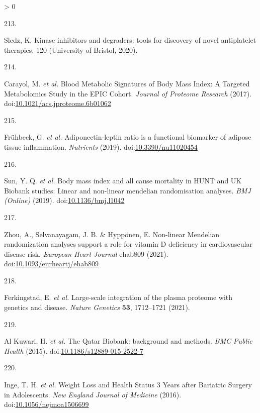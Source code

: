 \documentclass[11pt,twoside]{bristolthesis}
\newlength{\cslhangindent}
\newlength{\csllabelwidth}
\newenvironment{CSLReferences}[2] %
 {%
  \setlength{\parindent}{0pt}
  \ifodd #1 \everypar{\setlength{\hangindent}{\cslhangindent}}\ignorespaces\fi
  \ifnum #2 > 0
  \setlength{\parskip}{#2\baselineskip}
  \fi
 }%
 {}
\newcommand{\CSLLeftMargin}[1]{\parbox[t]{\csllabelwidth}{#1}}
\newcommand{\CSLRightInline}[1]{\parbox[t]{\linewidth - \csllabelwidth}{#1}\break}
\begin{document}
\begin{CSLReferences}{0}{0}
\leavevmode\hypertarget{ref-Sledz2020}{}%
\CSLLeftMargin{213. }
\CSLRightInline{Sledz, K. {Kinase inhibitors and degraders: tools for discovery of novel antiplatelet therapies}. 120 (University of Bristol, 2020).}

\leavevmode\hypertarget{ref-Carayol2017c}{}%
\CSLLeftMargin{214. }
\CSLRightInline{Carayol, M. \emph{et al.} {Blood Metabolic Signatures of Body Mass Index: A Targeted Metabolomics Study in the EPIC Cohort}. \emph{Journal of Proteome Research} (2017). doi:\href{https://doi.org/10.1021/acs.jproteome.6b01062}{10.1021/acs.jproteome.6b01062}}

\leavevmode\hypertarget{ref-Fruhbeck2019}{}%
\CSLLeftMargin{215. }
\CSLRightInline{Frühbeck, G. \emph{et al.} {Adiponectin-leptin ratio is a functional biomarker of adipose tissue inflammation}. \emph{Nutrients} (2019). doi:\href{https://doi.org/10.3390/nu11020454}{10.3390/nu11020454}}

\leavevmode\hypertarget{ref-Sun2019}{}%
\CSLLeftMargin{216. }
\CSLRightInline{Sun, Y. Q. \emph{et al.} {Body mass index and all cause mortality in HUNT and UK Biobank studies: Linear and non-linear mendelian randomisation analyses}. \emph{BMJ (Online)} (2019). doi:\href{https://doi.org/10.1136/bmj.l1042}{10.1136/bmj.l1042}}

\leavevmode\hypertarget{ref-Zhou2021}{}%
\CSLLeftMargin{217. }
\CSLRightInline{Zhou, A., Selvanayagam, J. B. \& Hyppönen, E. {Non-linear Mendelian randomization analyses support a role for vitamin D deficiency in cardiovascular disease risk}. \emph{European Heart Journal} ehab809 (2021). doi:\href{https://doi.org/10.1093/eurheartj/ehab809}{10.1093/eurheartj/ehab809}}

\leavevmode\hypertarget{ref-Ferkingstad2021}{}%
\CSLLeftMargin{218. }
\CSLRightInline{Ferkingstad, E. \emph{et al.} {Large-scale integration of the plasma proteome with genetics and disease}. \emph{Nature Genetics} \textbf{53}, 1712--1721 (2021).}

\leavevmode\hypertarget{ref-AlKuwari2015}{}%
\CSLLeftMargin{219. }
\CSLRightInline{Al Kuwari, H. \emph{et al.} {The Qatar Biobank: background and methods}. \emph{BMC Public Health} (2015). doi:\href{https://doi.org/10.1186/s12889-015-2522-7}{10.1186/s12889-015-2522-7}}

\leavevmode\hypertarget{ref-Inge2016}{}%
\CSLLeftMargin{220. }
\CSLRightInline{Inge, T. H. \emph{et al.} {Weight Loss and Health Status 3 Years after Bariatric Surgery in Adolescents}. \emph{New England Journal of Medicine} (2016). doi:\href{https://doi.org/10.1056/nejmoa1506699}{10.1056/nejmoa1506699}}


\end{CSLReferences}
\end{document}
